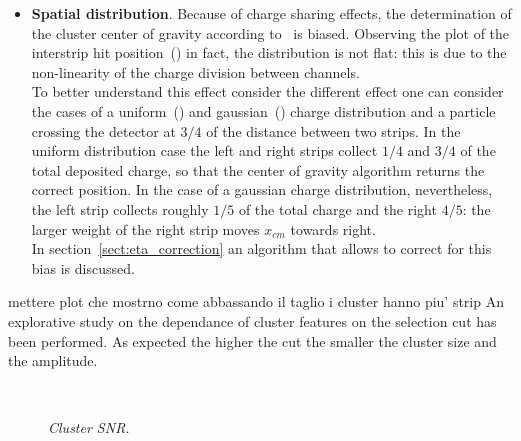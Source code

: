 \begin{itemize}
\begin{figure}
\end{figure}

\item {\bf Spatial distribution}. Because of charge sharing effects, the
  determination of the cluster center of gravity according to~ is
  biased. Observing the plot of the interstrip hit
  position~() in fact, the distribution is not flat: this is
  due to the non-linearity of the
  charge division between channels.\\
  To better understand this effect consider the different effect one can
  consider the cases of a uniform~() and
  gaussian~() charge distribution and a particle
  crossing the detector at $3/4$ of the distance between two
  strips. In the uniform distribution case the left and right strips collect
  $1/4$ and $3/4$ of the total deposited charge,
  so that the center of gravity algorithm returns the correct position. In the case
  of a gaussian charge distribution, nevertheless, the left strip collects roughly
  $1/5$ of the total charge and the right $4/5$: the larger weight of the right strip
  moves $x_{cm}$ towards right.\\
  In section~\ref{sect:eta_correction} an algorithm that allows to correct for
  this bias is discussed.
\end{itemize}



{\color{red} mettere plot che mostrno come abbassando il taglio i cluster hanno piu' strip}
An explorative study on the dependance of cluster features on the selection cut
has been performed. As expected the higher the cut the smaller the cluster size
and the amplitude. %
\begin{figure}[!htbp]
  \centering 
  \\
  \caption{ {\it Cluster SNR.}}
  \label{fig:clusteramplitude}
\end{figure}


